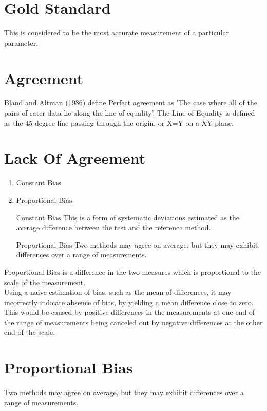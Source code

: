 \documentclass[12pt, a4paper]{report}
\theoremstyle{plain}
\theoremstyle{definition}
\theoremstyle{remark}
\begin{document}
	\section{Gold Standard} This is considered to be the most
	accurate measurement of a particular parameter.
	
	\section{Agreement} Bland and Altman (1986) define Perfect
	agreement as 'The case where all of the pairs of rater data lie
	along the line of equality'. The Line of Equality is defined as
	the 45 degree line passing through the origin, or X=Y on a XY
	plane.
	
	\section{Lack Of Agreement}
	\begin{enumerate}
		\item Constant Bias\item Proportional Bias
	\end{enumerate}
	\begin{itemize}
		\item[Constant Bias] This is a form of systematic deviations estimated as the average difference between the test
		and the reference method.
		\item[Proportional Bias] Two methods may agree on average, but they may exhibit differences over a range of measurements.
	\end{itemize}
	
	Proportional Bias is a difference in the two measures which is proportional to the scale of the measurement. \\Using a naive estimation of bias, such as the mean of differences, it may incorrectly indicate absence of bias, by yielding a mean difference close to zero. This would be caused by positive differences in the measurements at one end of the range of measurements being canceled out by negative differences at the other end of the scale.
	
	\section*{Proportional Bias} Two methods may agree on
	average, but they may exhibit differences over a range of measurements.
	
	
	
\end{document}
